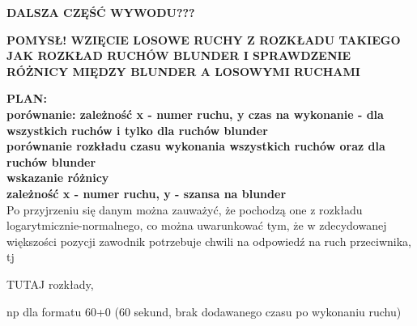 \documentclass[inzynierska]{pwr_wmat_praca_dyplomowa}
\theoremstyle{plain}
\numberwithin{theorem}{chapter}
\theoremstyle{definition}
\numberwithin{theorem}{chapter}
\begin{document}
	

\textbf{DALSZA CZĘŚĆ WYWODU???}


\textbf{POMYSŁ! WZIĘCIE LOSOWE RUCHY Z ROZKŁADU TAKIEGO JAK ROZKŁAD RUCHÓW BLUNDER I SPRAWDZENIE RÓŻNICY MIĘDZY BLUNDER A LOSOWYMI RUCHAMI}







\textbf{PLAN:}\\
\textbf{porównanie: zależność x -  numer ruchu, y czas na wykonanie - dla wszystkich ruchów i tylko dla ruchów blunder}\\

\textbf{porównanie rozkładu czasu wykonania wszystkich ruchów oraz dla ruchów blunder\\
wskazanie różnicy}\\

\textbf{zależność x - numer ruchu, y - szansa na blunder}\\


























Po przyjrzeniu się danym można zauważyć, że pochodzą one z rozkładu logarytmicznie-normalnego, co można uwarunkować tym, że w zdecydowanej większości pozycji zawodnik potrzebuje chwili na odpowiedź na ruch przeciwnika, tj 



TUTAJ rozkłady, 	

np dla formatu 60+0 (60 sekund, brak dodawanego czasu po wykonaniu ruchu)
\end{document}
